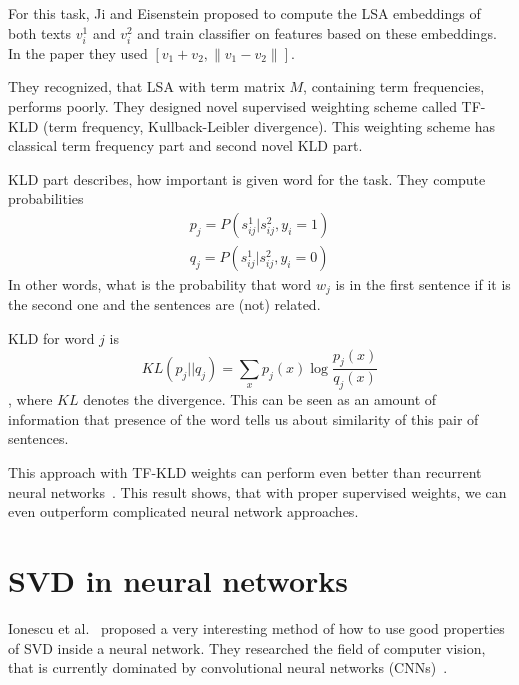         For this task, Ji and Eisenstein proposed to compute the LSA embeddings of both texts $v_i^1$ and $v_i^2$ and train classifier on features based on these embeddings.
        In the paper they used $[v_1 + v_2, \| v_1- v_2 \|]$.
        
        They recognized, that LSA with term matrix $M$, containing term frequencies, performs poorly. 
        They designed novel supervised weighting scheme called TF-KLD (term frequency, Kullback-Leibler divergence). 
        This weighting scheme has classical term frequency part and second novel KLD part.
        
        KLD part describes, how important is given word for the task.
        They compute probabilities 
        \begin{equation}
        \begin{split}
        p_j = P(s_{ij}^1| s_{ij}^2, y_i=1) \\
        q_j = P(s_{ij}^1| s_{ij}^2, y_i=0)   
        \end{split}
        \end{equation}
        In other words, what is the probability that word $w_j$ is in the first sentence if it is the second one and the sentences are (not) related.
        
        KLD for word $j$ is 
        \begin{equation}
        KL(p_j || q_j) = \sum_x p_j(x) \log \frac{p_j(x)}{q_j(x)}
        \end{equation},
         where $KL$ denotes the  divergence.
        This can be seen as an amount of information that presence of the word tells us about similarity of this pair of sentences. 
    
        This approach with TF-KLD weights can perform even better than recurrent neural networks~\cite{conneau2017supervised}.
        This result shows, that with proper supervised weights, we can even outperform complicated neural network approaches.
        

\section{SVD in neural networks} \label{sec:nn:svd}
    Ionescu et al.~\cite{ionescu2015training} %
    proposed a very interesting method of how to use good properties of SVD inside a neural network.
    They researched the field of computer vision, that is currently dominated by convolutional neural networks (CNNs)~\cite{lecun1998}.
    

